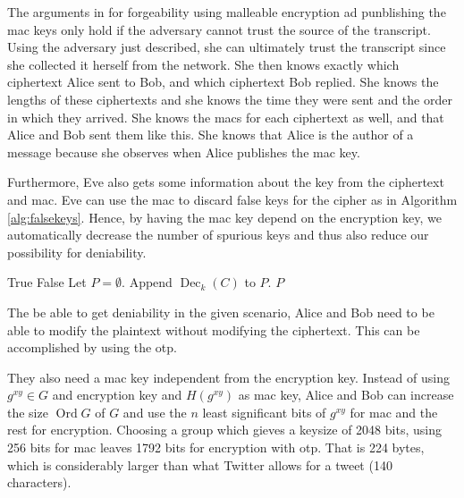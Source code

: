 \documentclass[draft]{llncs}
\DeclareMathOperator{\dec}{\mathrm{Dec}}
\DeclareMathOperator{\mac}{\mathrm{MAC}}
\DeclareMathOperator{\ord}{Ord}
\DeclareMathOperator{\K}{\mathcal K}
\begin{document}
The arguments in \cite{otr2004} for forgeability using malleable encryption ad 
punblishing the \ac{mac} keys only hold if the adversary cannot trust the 
source of the transcript.
Using the adversary just described, she can ultimately trust the transcript 
since she collected it herself from the network.
She then knows exactly which ciphertext Alice sent to Bob, and which ciphertext 
Bob replied.
She knows the lengths of these ciphertexts and she knows the time they were 
sent and the order in which they arrived.
She knows the \acp{mac} for each ciphertext as well, and that Alice and Bob 
sent them like this.
She knows that Alice is the author of a message because she observes when Alice 
publishes the \ac{mac} key.

Furthermore, Eve also gets some information about the key from the ciphertext 
and \ac{mac}.
Eve can use the \ac{mac} to discard false keys for the cipher as in Algorithm 
\ref{alg:falsekeys}.
Hence, by having the \ac{mac} key depend on the encryption key, we 
automatically decrease the number of spurious keys and thus also reduce our 
possibility for deniability.

\begin{algorithm}
  \caption{%
    Algorithm for finding possible plaintexts and discarding false keys.
  }
  \label{alg:falsekeys}
  \begin{algorithmic}
      \If{$\mac_{H(k)}( C ) = M$}
        \State \Return True
      \EndIf
      \State \Return False
    \EndFunction
    \Statex
      \State Let $P = \emptyset$.
      \ForAll{$k\in \K$}\Comment{Keyspace $\K$}
          \State Append $\dec_k( C )$ to $P$.
        \EndIf
      \EndFor
      \State \Return $P$
    \EndFunction
  \end{algorithmic}
\end{algorithm}

The be able to get deniability in the given scenario, Alice and Bob need to be 
able to modify the plaintext without modifying the ciphertext.
This can be accomplished by using the \ac{otp}.

They also need a \ac{mac} key independent from the encryption key.
Instead of using \(g^{xy}\in G\) and encryption key and \(H(g^{xy})\) as 
\ac{mac} key, Alice and Bob can increase the size \(\ord G\) of \(G\) and use 
the \(n\) least significant bits of \(g^{xy}\) for \ac{mac} and the rest for 
encryption.
Choosing a group which gieves a keysize of 2048 bits, using 256 bits for 
\ac{mac} leaves 1792 bits for encryption with \ac{otp}.
That is 224 bytes, which is considerably larger than what Twitter allows for 
a tweet (140 characters).
\end{document}
